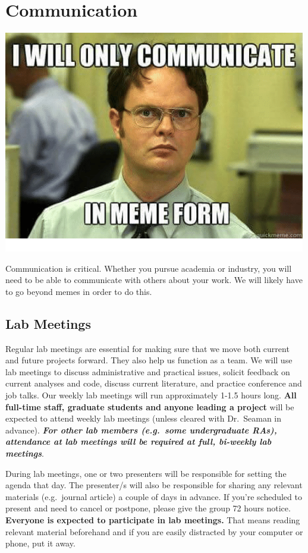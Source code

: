 \documentclass[
]{book}
\begin{document}
\hypertarget{communication}{%
\chapter{Communication}\label{communication}}

\includegraphics{images/communication.png}

Communication is critical. Whether you pursue academia or industry, you will need to be able to communicate with others about your work. We will likely have to go beyond memes in order to do this.

\hypertarget{lab-meetings}{%
\section{Lab Meetings}\label{lab-meetings}}

Regular lab meetings are essential for making sure that we move both current and future projects forward. They also help us function as a team. We will use lab meetings to discuss administrative and practical issues, solicit feedback on current analyses and code, discuss current literature, and practice conference and job talks. Our weekly lab meetings will run approximately 1-1.5 hours long. \textbf{All full-time staff, graduate students and anyone leading a project} will be expected to attend weekly lab meetings (unless cleared with Dr.~Seaman in advance). \textbf{\emph{For other lab members (e.g.~some undergraduate RAs), attendance at lab meetings will be required at full, bi-weekly lab meetings}}.

During lab meetings, one or two presenters will be responsible for setting the agenda that day. The presenter/s will also be responsible for sharing any relevant materials (e.g.~journal article) a couple of days in advance. If you're scheduled to present and need to cancel or postpone, please give the group 72 hours notice. \textbf{Everyone is expected to participate in lab meetings.} That means reading relevant material beforehand and if you are easily distracted by your computer or phone, put it away.
\end{document}
